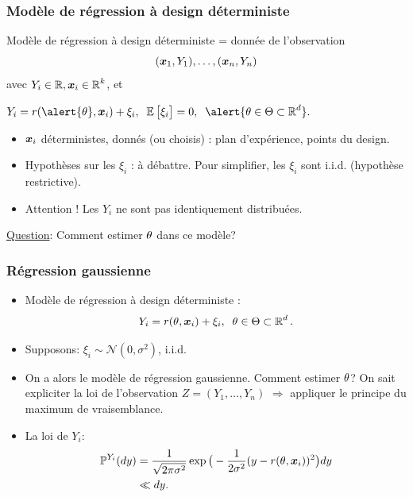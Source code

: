 \begin{frame}
\frametitle{Modèle de régression à design déterministe}
\begin{df}
Modèle de régression \alert{à design déterministe} = donnée de
l'observation
$$(\operatorname{\boldsymbol{x}}_1,Y_1),\ldots, (\operatorname{\boldsymbol{x}}_n,Y_n)$$
avec $Y_i \in \operatorname{{\mathbb R}}, \operatorname{\boldsymbol{x}}_i\in \operatorname{{\mathbb R}}^k$, et \\\vspace{3mm} \centerline{$Y_i
=
r(\alert{\truetheta},\bx_i)+\xi_i,\;\;\E\big[\xi_i\big]=0,\;\;\alert{
\truetheta \in \Theta \subset \R^d}.$}
\begin{itemize}
\item $\operatorname{\boldsymbol{x}}_i$ déterministes, donnés (ou choisis) : plan d'expérience, points du \og design\fg{}.
\item Hypothèses sur les $\xi_i$ : à débattre. \alert{Pour simplifier}, les $\xi_i$ sont i.i.d. \alert{ (hypothèse restrictive)}.
\item \alert{ Attention !} Les $Y_i$ ne sont \alert{pas identiquement distribuées}.
\end{itemize}
\end{df}

 \underline{Question}: Comment estimer $\theta$ dans ce modèle?

\end{frame}

\begin{frame}
\frametitle{Régression gaussienne}


\begin{itemize}
\item  Modèle de régression à design déterministe :
$$Y_i =
r({\theta},\operatorname{\boldsymbol{x}}_i)+\xi_i,\;\;\theta \in \Theta\subset  \operatorname{{\mathbb R}}^d.$$
\item  Supposons: $\xi_i \sim {\mathcal N}(0,\sigma^2)$, i.i.d.
\item On a alors le modèle de \alert{régression gaussienne}.
Comment estimer $\theta$?  \alert{On sait expliciter la loi
de l'observation} $Z=(Y_1,\dots,Y_n)$ $\Longrightarrow$ appliquer le
principe du maximum de vraisemblance.

\item La loi de $Y_i$:
\begin{align*}
\operatorname{{\mathbb P}}^{Y_i}(dy) & = \frac{1}{\sqrt{2\pi \sigma^2}}\exp\big
(-\frac{1}{2\sigma^2}(y-r({\theta},\operatorname{\boldsymbol{x}}_i))^2\big)dy \\
& \ll dy.
\end{align*}

\end{itemize}
\end{frame}

